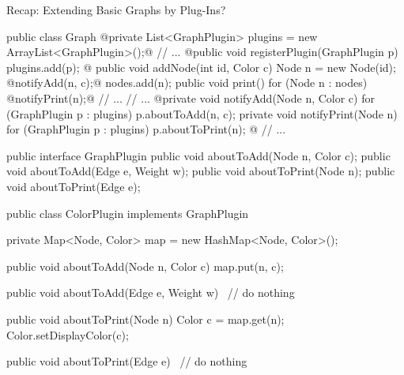 \begin{frame}[fragile]{Recap: Extending Basic Graphs by Plug-Ins?}
	\begin{mycolumns}[columns=2,widths={50,50}]
\begin{codetight}[basicstyle=\tiny]{}
public class Graph {
	@private List<GraphPlugin> plugins = new ArrayList<GraphPlugin>();@
	// ...	
	@public void registerPlugin(GraphPlugin p){
		plugins.add(p);
	}@
	public void addNode(int id, Color c){
		Node n = new Node(id);
		@notifyAdd(n, c);@
		nodes.add(n);
	}
	public void print() {
		for (Node n : nodes) {
			@notifyPrint(n);@
			// ...
		}
		// ...
	}
	@private void notifyAdd(Node n, Color c) {
		for (GraphPlugin p : plugins) {
			p.aboutToAdd(n, c);
		}
	}
	private void notifyPrint(Node n) {
		for (GraphPlugin p : plugins) {
			p.aboutToPrint(n);
		}
	}@
	// ...
}
\end{codetight}
		\mynextcolumn
\begin{codetight}[basicstyle=\tiny]{}
public interface GraphPlugin {
	public void aboutToAdd(Node n, Color c);
	public void aboutToAdd(Edge e, Weight w);
	public void aboutToPrint(Node n);
	public void aboutToPrint(Edge e);
}
\end{codetight}
\begin{codetight}[basicstyle=\tiny]{}
public class ColorPlugin implements GraphPlugin {
	private Map<Node, Color> map = new HashMap<Node, Color>();

	public void aboutToAdd(Node n, Color c) {
		map.put(n, c);
	}
	
	public void aboutToAdd(Edge e, Weight w) {
		~// do nothing~
	}
	
	public void aboutToPrint(Node n) {
		Color c = map.get(n);
		Color.setDisplayColor(c);
	}
	
	public void aboutToPrint(Edge e) {
		~// do nothing~
	}
}
\end{codetight}
	\end{mycolumns}
\end{frame}

